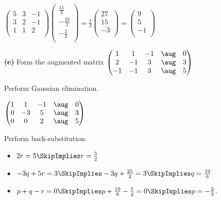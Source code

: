 \documentclass[oneside,12pt]{amsart}
\begin{document}
$
\begin{pmatrix}
5 & 3 &  -1  \\
3 & 2 &  -1  \\
1 & 1 &   2  \\
\end{pmatrix}
\begin{pmatrix}
\frac{11}{3} \\[6pt]
-\frac{10}{3}\\[6pt]
-\frac{2}{3}\\[6pt]
\end{pmatrix}
=
\frac{1}{3}
\begin{pmatrix}
27\\[6pt]
15\\[6pt]
-3\\[6pt]
\end{pmatrix}
=
\begin{pmatrix}
9 \\[6pt]
5\\[6pt]
-1 \\[6pt]
\end{pmatrix}
$

\bigskip


\textbf{(e)} Form the augmented matrix
$
\begin{pmatrix}
  1  &  1 &  -1 & \aug &  0  \\
  2  & -1 &   3 & \aug &  3  \\
 -1  & -1 &   3 & \aug &  5  \\
\end{pmatrix}
$

Perform Gaussian elimination.

\bigskip

$
\begin{pmatrix}
   1  &  1 &  -1 & \aug &  0  \\
   0  & -3 &   5 & \aug &  3  \\
   0  & 0  &   2 & \aug &  5  \\
\end{pmatrix}
$

\bigskip

Perform back-substitution.

\begin{itemize}
\item $2r=5 \SkipImplies r = \frac{5}{2}$
\item $-3q + 5r = 3 \SkipImplies -3q + \frac{25}{2} = 3 \SkipImplies q = \frac{19}{6}$
\item $p + q -r = 0 \SkipImplies p + \frac{19}{6} - \frac{5}{2} = 0 \SkipImplies p = -\frac{2}{3}$.
\end{itemize}
\end{document}
